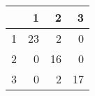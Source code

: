 \begin{tabular}{rrrr}
  \hline
 & 1 & 2 & 3 \\ 
  \hline
1 &  23 &   2 &   0 \\ 
  2 &   0 &  16 &   0 \\ 
  3 &   0 &   2 &  17 \\ 
   \hline
\end{tabular}
